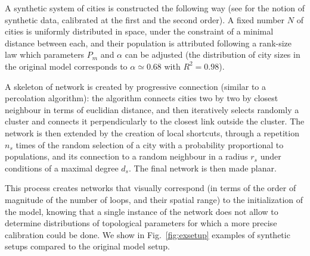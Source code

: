 A synthetic system of cities is constructed the following way (see \cite{raimbault2016generation} for the notion of synthetic data, calibrated at the first and the second order). A fixed number $N$ of cities is uniformly distributed in space, under the constraint of a minimal distance between each, and their population is attributed following a rank-size law which parameters $P_{m}$ and $\alpha$ can be adjusted (the distribution of city sizes in the original model corresponds to $\alpha\simeq 0.68$ with $R^2=0.98$).

A skeleton of network is created by progressive connection (similar to a percolation algorithm): the algorithm connects cities two by two by closest neighbour in terms of euclidian distance, and then iteratively selects randomly a cluster and connects it perpendicularly to the closest link outside the cluster. The network is then extended by the creation of local shortcuts, through a repetition $n_s$ times of the random selection of a city with a probability proportional to populations, and its connection to a random neighbour in a radius $r_s$ under conditions of a maximal degree $d_s$. The final network is then made planar.


This process creates networks that visually correspond (in terms of the order of magnitude of the number of loops, and their spatial range) to the initialization of the model, knowing that a single instance of the network does not allow to determine distributions of topological parameters for which a more precise calibration could be done. We show in Fig.~\ref{fig:exsetup} examples of synthetic setups compared to the original model setup.


